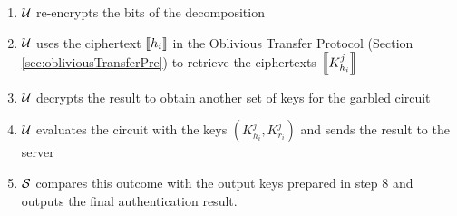\begin{enumerate}
\item $\mathcal{U}$ re-encrypts the bits of the decomposition
\item $\mathcal{U}$ uses the ciphertext $\left\llbracket h_{i}\right\rrbracket$ in the Oblivious Transfer Protocol (Section \ref{sec:obliviousTransferPre}) to retrieve the ciphertexts $\left\llbracket K_{h_{i}}^{j}\right\rrbracket$
\item $\mathcal{U}$ decrypts the result to obtain another set of keys for the garbled circuit
\item $\mathcal{U}$ evaluates the circuit with the keys $(K_{h_{i}}^{j}, K_{r_{i}}^{j})$ and sends the result to the server
\item $\mathcal{S}$ compares this outcome with the output keys prepared in step 8 and outputs the final authentication result.
\end{enumerate}

\begin{figure}[htbp!] 
  \centering {}
\end{figure}
